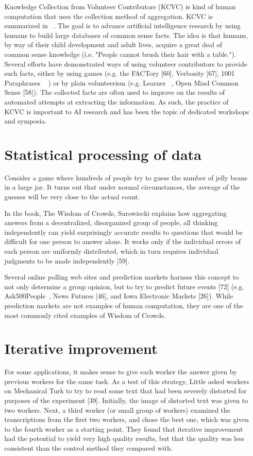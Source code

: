 \documentclass{acm_proc_article-sp}
\begin{document}
Knowledge Collection from Volunteer Contributors (KCVC) is kind of human computation that uses the collection method of aggregation. KCVC is summarized in ~\cite{chklovski2005t}. The goal is to advance artificial intelligence research by using humans to build large databases of common sense facts. The idea is that humans, by way of their child development and adult lives, acquire a great deal of common sense knowledge (i.e. "People cannot brush their hair with a table."). Several efforts have demonstrated ways of using volunteer contributors to provide such facts, either by using games (e.g. the FACTory [60], Verbosity [67], 1001 Paraphrases ~\cite{chklovski2005} ) or by plain volunteerism (e.g. Learner ~\cite{chklovski2003}, Open Mind Common Sense [58]). The collected facts are often used to improve on the results of automated attempts at extracting the information. As such, the practice of KCVC is important to AI research and has been the topic of dedicated workshops and symposia.
\section*{Statistical processing of data}
Consider a game where hundreds of people try to guess the number of jelly beans in a large jar. It turns out that under normal circumstances, the average of the guesses will be very close to the actual count.

In the book, The Wisdom of Crowds, Surowiecki explains how aggregating answers from a decentralized, disorganized group of people, all thinking independently can yield surprisingly accurate results to questions that would be difficult for one person to answer alone. It works only if the individual errors of each person are uniformly distributed, which in turn requires individual judgments to be made independently [59].

Several online polling web sites and prediction markets harness this concept to not only determine a group opinion, but to try to predict future events [72] (e.g. Ask500People~\cite{mcardletermtalk}, News Futures [46], and Iowa Electronic Markets [26]). While prediction markets are not examples of human computation, they are one of the most commonly cited examples of Wisdom of Crowds.
\section*{Iterative improvement}
For some applications, it makes sense to give each worker the answer given by previous workers for the same task. As a test of this strategy, Little asked workers on Mechanical Turk to try to read some text that had been severely distorted for purposes of the experiment [39]. Initially, the image of distorted text was given to two workers. Next, a third worker (or small group of workers) examined the transcriptions from the first two workers, and chose the best one, which was given to the fourth worker as a starting point. They found that iterative improvement had the potential to yield very high quality results, but that the quality was less consistent than the control method they compared with.
\end{document}
